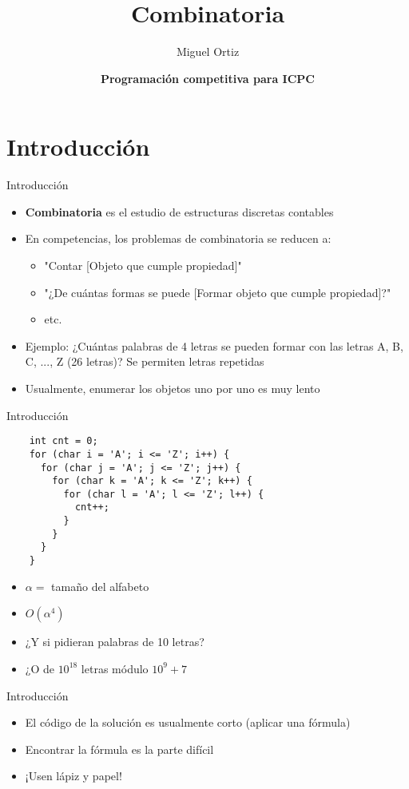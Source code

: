 \documentclass[10pt]{beamer}
\title{Combinatoria}
\author{Miguel Ortiz}
\institute{Octubre 2023}
\date{\textbf{Programación competitiva para ICPC}}
\newcommand{\bi}{\begin{itemize}}
\newcommand{\ei}{\end{itemize}}
\begin{document}
\maketitle

\section{Introducción}

\begin{frame}{Introducción}
  \bi
    \item \textbf{Combinatoria} es el estudio de estructuras discretas contables
    \item En competencias, los problemas de combinatoria se reducen a:
      \bi
        \item "Contar [Objeto que cumple propiedad]"
        \item "¿De cuántas formas se puede [Formar objeto que cumple propiedad]?"
        \item etc.
      \ei 
    \item Ejemplo: ¿Cuántas palabras de 4 letras se pueden formar con las letras A, B, C, ..., Z (26 letras)? Se permiten letras repetidas
    \item<2-> Usualmente, enumerar los objetos uno por uno es muy lento
  \ei
\end{frame}

\begin{frame}[fragile]{Introducción}
  \begin{verbatim}
    int cnt = 0;
    for (char i = 'A'; i <= 'Z'; i++) {
      for (char j = 'A'; j <= 'Z'; j++) {
        for (char k = 'A'; k <= 'Z'; k++) {
          for (char l = 'A'; l <= 'Z'; l++) {
            cnt++;
          }
        }
      }
    }
  \end{verbatim}
  \bi
    \item $\alpha = $ tamaño del alfabeto
    \item $O(\alpha^4)$
    \item<3-> ¿Y si pidieran palabras de 10 letras?
    \item<4-> ¿O de $10^{18}$ letras módulo $10^9+7$
  \ei
\end{frame}

\begin{frame}{Introducción}
  \bi
    \item El código de la solución es usualmente corto (aplicar una fórmula)
    \item Encontrar la fórmula es la parte difícil
    \item<2-> ¡Usen lápiz y papel!
  \ei
\end{frame}
\end{document}
